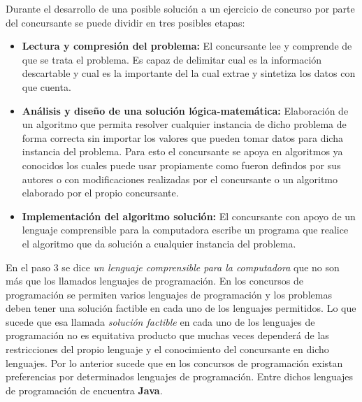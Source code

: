 Durante el desarrollo de una posible solución a un ejercicio de concurso por parte del concursante se puede dividir en tres posibles etapas:

\begin{itemize}
	\item \textbf{Lectura y compresión del problema:} El concursante lee y comprende de que se trata el problema. Es capaz de delimitar cual es la información descartable y cual es la importante del la cual extrae y sintetiza los datos con que cuenta.
	\item \textbf{Análisis y diseño de una solución lógica-matemática:} Elaboración de un algoritmo que permita resolver cualquier instancia de dicho problema de forma correcta sin importar los valores que pueden tomar datos para dicha instancia del problema. Para esto el concursante se apoya en algoritmos ya conocidos los cuales puede usar propiamente como fueron defindos por sus autores o con modificaciones realizadas por el concursante o un algoritmo elaborado por el propio concursante. 
	\item \textbf{Implementación del algoritmo solución:} El concursante con apoyo de un lenguaje comprensible para la computadora escribe un programa que realice el algoritmo que da solución a cualquier instancia del problema.
\end{itemize}

En el paso 3 se dice \emph{un lenguaje comprensible para la computadora} que no son más que los llamados lenguajes de programación. En los concursos de programación se permiten varios lenguajes de programación y los problemas deben tener una solución factible en cada uno de los lenguajes permitidos. Lo que sucede que esa llamada \emph{solución factible} en cada uno de los lenguajes de programación no es equitativa producto que muchas veces dependerá de las restricciones del propio lenguaje y el conocimiento del concursante en dicho lenguajes. Por lo anterior sucede que en los concursos de programación existan preferencias por determinados lenguajes de programación. Entre dichos lenguajes de programación de encuentra \textbf{Java}.    
